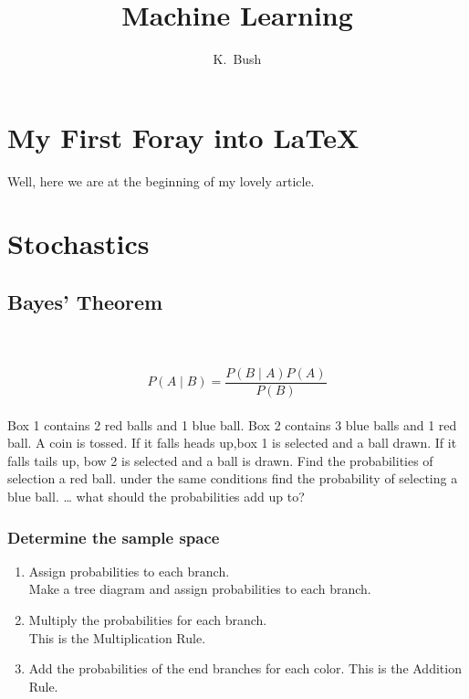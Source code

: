 \documentclass[a4paper,12pt]{article}
\author{K.~Bush}
\title{Machine Learning}
\begin{document}
\maketitle
\tableofcontents

\listoffigures
{}


\section{My First Foray into \LaTeX{} }
Well, here we are at the beginning of my lovely article.
\section{Stochastics}

\subsection{Bayes' Theorem}

\noindent{}\\
 \\$${\displaystyle P(A\mid B)={\frac {P(B\mid A)P(A)}{P(B)}}}$$\\



 
 Box 1 contains 2 red balls and 1 blue ball. Box 2 contains 3 blue balls and 1 red ball. A coin is tossed. If it falls heads up,box 1 is selected and a ball drawn. If it falls tails up, bow 2 is selected and a ball is drawn. Find the probabilities of selection a red ball. under the same conditions find the probability of selecting a blue ball.
 \ldots{} what should the probabilities add up to?

\subsubsection{Determine the sample space}

\begin{enumerate}

\item Assign probabilities to each branch.\\
Make a tree diagram and assign probabilities to each branch.

\item Multiply the probabilities for each branch.\\
This is the Multiplication Rule.

\item Add the probabilities of the end branches for each color.
This is the Addition Rule. 
\end{enumerate}
\end{document}
